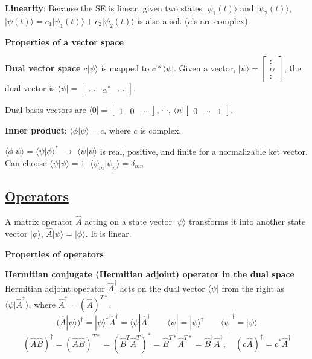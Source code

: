     \textbf{Linearity}: Because the SE is linear, given two states $|\psi_1(t) \rangle$ and $|\psi_2(t) \rangle$, $|\psi(t) \rangle = c_1 |\psi_1(t) \rangle + c_2|\psi_2(t)\rangle$ is also a sol. ($c$'s are complex).

\textbf{Properties of a vector space}

\textbf{Dual vector space}
$c|\psi \rangle$ is mapped to $c* \langle \psi |$. Given a vector, $|\psi \rangle = \begin{bmatrix} : \\ \alpha \\ : \end{bmatrix}$, the dual vector is $\langle \psi | = \begin{bmatrix} \cdots & \alpha^* & \cdots \end{bmatrix}$.

Dual basis vectors are $\langle 0 | = \begin{bmatrix} 1 & 0 & \cdots \end{bmatrix}$, $\cdots$, $\langle n| \begin{bmatrix} 0 & \cdots & 1 \end{bmatrix}$.

\textbf{Inner product}: $\langle \phi | \psi \rangle = c$, where $c$ is complex.

$\langle \phi | \psi \rangle = \langle \psi | \phi \rangle^*$ $\rightarrow$ $\langle \psi | \psi \rangle$ is real, positive, and finite for a normalizable ket vector. Can choose $\langle \psi | \psi \rangle = 1$. $\langle \psi_m | \psi_n \rangle = \delta_{mn}$

\subsection{\underline{Operators}}
A matrix operator $\widehat{A}$ acting on a state vector $|\psi \rangle$ transforms it into another state vector $|\phi \rangle$, $\widehat{A} |\psi \rangle = | \phi \rangle$. It is linear.

\textbf{Properties of operators}

\textbf{Hermitian conjugate (Hermitian adjoint) operator in the dual space} \\
Hermitian adjoint operator $\widehat{A}^{\dag}$ acts on the dual vector $\langle \psi |$ from the right as $\langle \psi | \widehat{A} ^{\dag} \rangle$, where $\widehat{A}^{\dag} = (\widehat{A})^{T*}$.
$$(\widehat{A} | \psi \rangle)^{\dag} = |\psi \rangle^{\dag} \widehat{A}^{\dag} = \langle \psi | \widehat{A}^{\dag} \qquad \langle \psi | = | \psi \rangle^{\dag} \qquad \langle \psi | ^{\dag} = | \psi \rangle$$
$$(\widehat{A}\widehat{B})^{\dag} = (\widehat{A} \widehat{B})^{T*} = (\widehat{B}^T \widehat{A}^T)^* = \widehat{B}^{T*} \widehat{A}^{T*} = \widehat{B}^{\dag} \widehat{A}^{\dag}, \quad (c\widehat{A})^{\dag} = c^* \widehat{A}^{\dag}$$

